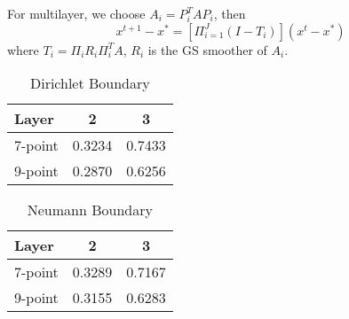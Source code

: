 For multilayer, we choose $A_i = P_i^T A P_i$, then
\begin{equation}
x^{t+1}-x^*=[\Pi_{i=1}^{J}(I-T_i)](x^t-x^*)
\end{equation}
where $T_i=\Pi_iR_i\Pi_i^TA$, $R_i$ is the GS smoother of $A_i$.

\begin{table}[!htp]
	\caption{Dirichlet Boundary}
	\begin{tabular}{l |c c}
		Layer& 2&3 \\ \hline
		7-point  & 0.3234 &	0.7433\\
		9-point  & 0.2870 &	0.6256\\
	\end{tabular}
\end{table}

\begin{table}[!htp]
	\caption{Neumann Boundary}
	\begin{tabular}{l |c c}
		Layer& 2&3 \\ \hline
		7-point  & 0.3289 &	0.7167\\
		9-point  & 0.3155 &	0.6283\\
	\end{tabular}
\end{table}


